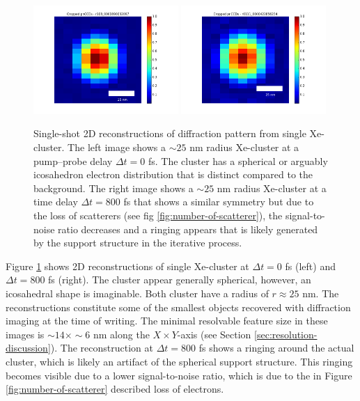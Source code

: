 \begin{figure}
	\centering
		\includegraphics[width=0.49\textwidth]{images/results/Xe_0_fs.png}
		\includegraphics[width=0.49\textwidth]{images/results/Xe_800_fs.png}
	\caption[Single-shot 2D reconstructions of $\sim 25$ nm radius Xe-clusters.]{Single-shot 2D reconstructions of diffraction pattern from single Xe-cluster. The left image shows a $\sim 25$ nm radius Xe-cluster at a pump--probe delay $\Delta t=0$ fs. The cluster has a spherical or arguably icosahedron electron distribution that is distinct compared to the background. The right image shows a $\sim 25$ nm radius Xe-cluster at a time delay $\Delta t=800$ fs that shows a similar symmetry but due to the loss of scatterers (see fig \ref{fig:number-of-scatterer}), the signal-to-noise ratio decreases and a ringing appears that is likely generated by the support structure in the iterative process.}
	\label{fig:Xe-2D-reconstructions}
\end{figure}
Figure \ref{fig:Xe-2D-reconstructions} shows 2D reconstructions of single Xe-cluster at $\Delta t = 0$ fs (left) and $\Delta t=800$ fs (right). The cluster appear generally spherical, however, an icosahedral shape is imaginable. Both cluster have a radius of $r\approx 25$ nm. The reconstructions constitute some of the smallest objects recovered with diffraction imaging at the time of writing. The minimal resolvable feature size in these images is $\sim 14\times \sim 6$ nm along the $X\times Y$-axis (see Section \ref{sec:resolution-discussion}). The reconstruction at $\Delta t=800$ fs shows a ringing around the actual cluster, which is likely an artifact of the spherical support structure. This ringing becomes visible due to a lower signal-to-noise ratio, which is due to the in Figure \ref{fig:number-of-scatterer} described loss of electrons.
%
%
%
